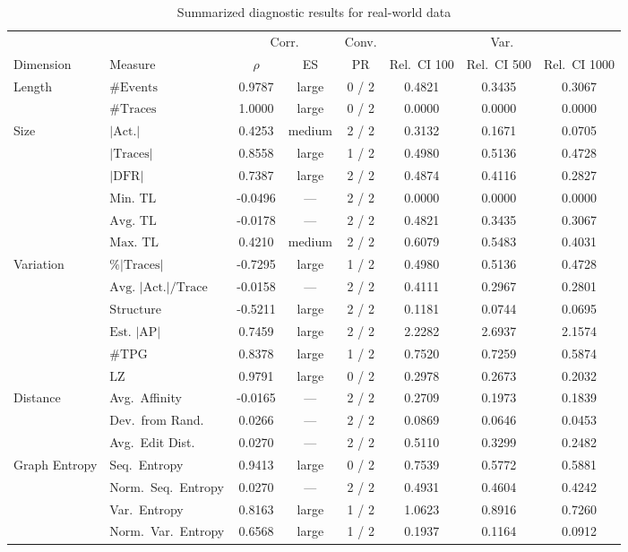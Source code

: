 \begin{table}[ht]
\centering
\setlength{\tabcolsep}{3pt}

\caption{Summarized diagnostic results for real-world data}
\label{tab:summarized_master_means_real_base}
\begin{tabular}{llcccccc}
\toprule
 & & \multicolumn{2}{c}{Corr.} & Conv. & \multicolumn{3}{c}{Var.} \\
Dimension & Measure & $\rho$ & ES & PR & Rel.\ CI 100 & Rel.\ CI 500 & Rel.\ CI 1000 \\
\midrule
Length & $\#\text{Events}$ & 0.9787 & large & 0 / 2 & 0.4821 & 0.3435 & 0.3067 \\
 & $\#\text{Traces}$ & 1.0000 & large & 0 / 2 & 0.0000 & 0.0000 & 0.0000 \\
\midrule
Size & $|\text{Act.}|$ & 0.4253 & medium & 2 / 2 & 0.3132 & 0.1671 & 0.0705 \\
 & $|\text{Traces}|$ & 0.8558 & large & 1 / 2 & 0.4980 & 0.5136 & 0.4728 \\
 & $|\text{DFR}|$ & 0.7387 & large & 2 / 2 & 0.4874 & 0.4116 & 0.2827 \\
 & $\text{Min. TL}$ & -0.0496 & --- & 2 / 2 & 0.0000 & 0.0000 & 0.0000 \\
 & $\text{Avg. TL}$ & -0.0178 & --- & 2 / 2 & 0.4821 & 0.3435 & 0.3067 \\
 & $\text{Max. TL}$ & 0.4210 & medium & 2 / 2 & 0.6079 & 0.5483 & 0.4031 \\
\midrule
Variation & $\%|\text{Traces}|$ & -0.7295 & large & 1 / 2 & 0.4980 & 0.5136 & 0.4728 \\
 & $\text{Avg.\ } | \text{Act.}| /\text{Trace}$ & -0.0158 & --- & 2 / 2 & 0.4111 & 0.2967 & 0.2801 \\
 & $\text{Structure}$ & -0.5211 & large & 2 / 2 & 0.1181 & 0.0744 & 0.0695 \\
 & $\text{Est.\ } |\text{AP}|$ & 0.7459 & large & 2 / 2 & 2.2282 & 2.6937 & 2.1574 \\
 & $\#\text{TPG}$ & 0.8378 & large & 1 / 2 & 0.7520 & 0.7259 & 0.5874 \\
 & $\text{LZ}$ & 0.9791 & large & 0 / 2 & 0.2978 & 0.2673 & 0.2032 \\
\midrule
Distance & Avg.\ Affinity & -0.0165 & --- & 2 / 2 & 0.2709 & 0.1973 & 0.1839 \\
 & Dev.\ from Rand. & 0.0266 & --- & 2 / 2 & 0.0869 & 0.0646 & 0.0453 \\
 & Avg.\ Edit Dist. & 0.0270 & --- & 2 / 2 & 0.5110 & 0.3299 & 0.2482 \\
\midrule
Graph Entropy & Seq.\ Entropy & 0.9413 & large & 0 / 2 & 0.7539 & 0.5772 & 0.5881 \\
 & Norm.\ Seq.\ Entropy & 0.0270 & --- & 2 / 2 & 0.4931 & 0.4604 & 0.4242 \\
 & Var.\ Entropy & 0.8163 & large & 1 / 2 & 1.0623 & 0.8916 & 0.7260 \\
 & Norm.\ Var.\ Entropy & 0.6568 & large & 1 / 2 & 0.1937 & 0.1164 & 0.0912 \\
\bottomrule
\end{tabular}


\end{table}
